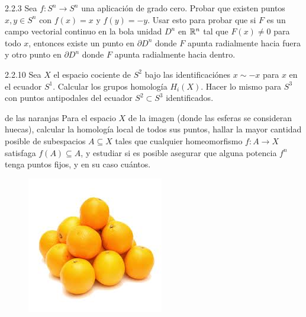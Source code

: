 \documentclass[twoside]{article}
\begin{document}
\newpage

\begin{ejercicio}{2.2.3}
Sea $f:S^n\to S^n$ una aplicación de grado cero. Probar que existen puntos $x,y\in S^n$ con $f(x)=x$ y $f(y)=-y$. Usar esto para probar que si $F$ es un campo vectorial continuo en la bola unidad $D^n$ en $\mathbb{R}^n$ tal que $F(x)\neq 0$ para todo $x$, entonces existe un punto en $\partial D^n$ donde $F$ apunta radialmente hacia fuera y otro punto en $\partial D^n$ donde $F$ apunta radialmente hacia dentro.
\end{ejercicio}
\begin{solucion}
\end{solucion}

\newpage

\begin{ejercicio}{2.2.10}
Sea $X$ el espacio cociente de $S^2$ bajo las identificaciónes $x\sim-x$ para $x$ en el ecuador $S^1$. Calcular los grupos homología $H_i(X)$. Hacer lo mismo para $S^3$ con puntos antipodales del ecuador $S^2\subset S^3$ identificados. 
\end{ejercicio}
\begin{solucion}
\end{solucion}

\newpage


\begin{ejercicio}{de las naranjas}
Para el espacio $X$ de la imagen (donde las esferas se consideran huecas), calcular la homología local de todos sus puntos, hallar la mayor cantidad posible de subespacios $A\subseteq X$ tales que cualquier homeomorfismo $f:A\to X$ satisfaga $f(A)\subseteq A$, y estudiar si es posible asegurar que alguna potencia $f^n$ tenga puntos fijos, y en su caso cuántos. 

\begin{figure}[h!]
\centering
\includegraphics[scale=0.5]{naranjas}
\end{figure}
\end{ejercicio}
\end{document}
